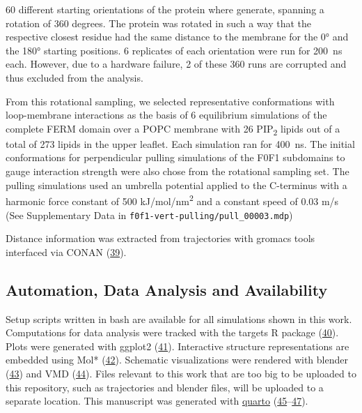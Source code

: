 \documentclass[
  twocolumn]{biophys-new-mod}
\begin{document}
60 different starting orientations of the protein where generate,
spanning a rotation of 360 degrees. The protein was rotated in such a
way that the respective closest residue had the same distance to the
membrane for the 0° and the 180° starting positions. 6 replicates of
each orientation were run for 200~ns each. However, due to a hardware
failure, 2 of these 360 runs are corrupted and thus excluded from the
analysis.

From this rotational sampling, we selected representative conformations
with loop-membrane interactions as the basis of 6 equilibrium
simulations of the complete FERM domain over a POPC membrane with 26
PIP\textsubscript{2} lipids out of a total of 273 lipids in the upper
leaflet. Each simulation ran for 400~ns. The initial conformations for
perpendicular pulling simulations of the F0F1 subdomains to gauge
interaction strength were also chose from the rotational sampling set.
The pulling simulations used an umbrella potential applied to the
C-terminus with a harmonic force constant of 500
kJ/mol/nm\textsuperscript{2} and a constant speed of 0.03 m/s (See
Supplementary Data in \texttt{f0f1-vert-pulling/pull\_00003.mdp})

Distance information was extracted from trajectories with gromacs tools
interfaced via CONAN
(\protect\hyperlink{ref-mercadanteCONANToolDecode2018}{39}).

\hypertarget{automation-data-analysis-and-availability}{%
\subsection{Automation, Data Analysis and
Availability}\label{automation-data-analysis-and-availability}}

Setup scripts written in bash are available for all simulations shown in
this work. Computations for data analysis were tracked with the targets
R package (\protect\hyperlink{ref-landauTargetsPackageDynamic2021}{40}).
Plots were generated with ggplot2 (\protect\hyperlink{ref-ggplot}{41}).
Interactive structure representations are embedded using Mol*
(\protect\hyperlink{ref-molstar}{42}). Schematic visualizations were
rendered with blender (\protect\hyperlink{ref-blender}{43}) and VMD
(\protect\hyperlink{ref-vmd}{44}). Files relevant to this work that are
too big to be uploaded to this repository, such as trajectories and
blender files, will be uploaded to a separate location. This manuscript
was generated with \href{https://quarto.org/}{quarto}
(\protect\hyperlink{ref-quarto}{45}--\protect\hyperlink{ref-rbetterposter}{47}).
\end{document}
